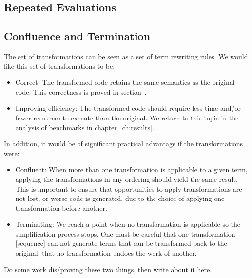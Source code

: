 \subsection{Repeated Evaluations}


\subsection{Confluence and Termination}

The set of transformations can be seen as a set of term rewriting rules. We
would like this set of transformations to be:
%
\begin{itemize}
    \item Correct: The transformed code retains the same semantics as the
        original code. This correctness is proved in
        section~\derp.

    \item Improving efficiency: The transformed code should require less time
        and/or fewer resources to execute than the original. We return to this
        topic in the analysis of benchmarks in chapter~\ref{ch:results}.
\end{itemize}
%
In addition, it would be of significant practical advantage if the
transformations were:
%
\begin{itemize}
    \item Confluent: When more than one transformation is applicable to a given
        term, applying the transformations in any ordering should yield the same
        result. This is important to ensure that opportunities to apply
        transformations are not lost, or worse code is generated, due to
        the choice of applying one transformation before another.

    \item Terminating: We reach a point when no transformation is applicable so
        the simplification process stops. One must be careful that one
        transformation [sequence] can not generate terms that can be transformed
        back to the original; that no transformation undoes the work of another.
\end{itemize}

Do some work dis/proving these two things, then write about it here.


